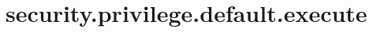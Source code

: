 \section{security.privilege.default.execute}
\label{configuration:SecurityPrivilegeDefaultExecute}
\TODO
